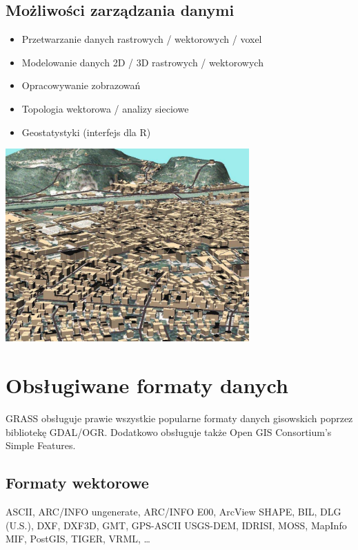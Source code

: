 \documentclass[notumble,a4paper,10pt,nofoldmark]{leaflet}
\newenvironment{myfig}[1][0pt plus 1.5ex minus .5ex]{\par\vspace*{#1}\begin{minipage}{\textwidth}\centering}{\end{minipage}}
\begin{document}
\subsection{Możliwości zarządzania danymi}

\begin{itemize}
\item Przetwarzanie danych rastrowych / wektorowych / voxel
\item Modelowanie danych 2D / 3D rastrowych / wektorowych 
\item Opracowywanie zobrazowań
\item Topologia wektorowa / analizy sieciowe
\item Geostatystyki (interfejs dla R)
\end{itemize}

\begin{myfig}[1ex]
\includegraphics[width=0.7\textwidth]{trento3d}
\end{myfig}

\section{Obsługiwane formaty danych}

GRASS obsługuje prawie wszystkie popularne formaty danych gisowskich poprzez bibliotekę GDAL/OGR. Dodatkowo obsługuje także Open GIS Consortium's Simple Features.

\subsection{Formaty wektorowe}
ASCII, ARC/INFO ungenerate, ARC/INFO E00, Arc\-View SHAPE, BIL, DLG (U.S.), DXF, DXF3D, GMT, GPS-ASCII USGS-DEM, IDRISI, MOSS, MapInfo MIF, PostGIS, TIGER, VRML, \dots
\end{document}
